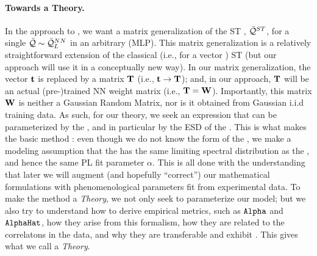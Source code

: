 


\paragraph{Towards a \SemiEmpirical Theory.}
In the \SETOL approach to \STATMECH, we want a matrix generalization of the ST \ModelQuality, $\bar{\mathcal{Q}}^{ST}$, for a single \LayerQuality
$\bar{\mathcal{Q}}\sim\bar{\mathcal{Q}}^{NN}_{L}$ in an arbitrary \MultiLayerPerceptron (MLP).
This matrix generalization is a relatively straightforward extension of the classical (i.e., for a vector \Teacher) \SMOG ST \ModelQuality (but our \SETOL approach will use it in a conceptually new way).
%
In our matrix generalization, the \Teacher vector ${\mathbf{t}}$ is replaced by a \Teacher matrix ${\mathbf{T}}$ (i.e., ${\mathbf{t}}\rightarrow{\mathbf{T}}$); 
and, in our \SETOL approach, ${\mathbf{T}}$ will be an actual (pre-)trained NN weight matrix (i.e., ${\mathbf{T}}={\mathbf{W}}$). 
Importantly, this matrix ${\mathbf{W}}$ is neither a Gaussian Random Matrix, nor is it obtained from Gaussian i.i.d training data.
As such, for our \SETOL theory, we seek an expression that can be parameterized by the \Teacher, and in particular by the ESD of the \Teacher.
This is what makes the basic method \SemiEmpirical: even though we do not know the form of the \Teacher,
we make a modeling assumption that the  \Teacher has the same limiting spectral distribution as the \Student, 
and hence the same PL fit parameter $\alpha$. 
This is all done with the understanding that later we will augment
(and hopefully ``correct'') our mathematical formulations with 
phenomenological parameters fit from experimental data.
To make the \SemiEmpirical method a \SemiEmpirical \emph{Theory}, 
we not only seek to parameterize our model; but 
we also try to understand 
how to derive \HTSR empirical metrics, such as $\texttt{Alpha}$ and $\texttt{AlphaHat}$,
how they arise from this formalism, 
how they are related to the correlatons in the data, and 
why they are transferable and exhibit \Universality.
This gives what we call a \SemiEmpirical \emph{Theory}.
